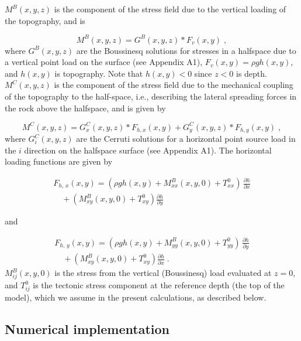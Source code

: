 \documentclass[draft,jgrga]{AGUTeX}
\begin{document}
\begin{article}
$M^B(x,y,z)$ is the component of the stress field due to the vertical
loading of the topography, and is

\begin{equation}
M^B(x, y, z) = G^B(x,y,z) * F_v(x, y) \; ,
\label{eqn:bous}
\end{equation}
where $G^B(x,y,z)$ are the Boussinesq solutions for stresses in a
halfspace due to a vertical point load on the surface (see Appendix A1), 
$F_v(x,y) = \rho g h(x,y)$, and $h(x,y)$ is topography. 
Note that $h(x,y)<0$ since $z<0$ is
depth. $M^C(x,y,z)$ is the component of the stress field due to the
mechanical coupling of the topography to the half-space, i.e.,
describing the lateral spreading forces in the rock above the halfspace,
and is given by

\begin{equation}
M^C(x, y, z) = G_x^C(x,y,z) * F_{h, x}(x, y) + G_y^C(x,y,z) * F_{h, y}(x, y) \; ,
\end{equation}
where $G_i^C(x,y,z)$ are the Cerruti solutions for a horizontal point
source load in the $i$ direction on the halfspace surface (see Appendix
A1). The horizontal loading functions are given by

\begin{equation}
\begin{split}
F_{h, \, x}(x,y) = ( \rho g h(x,y) + M_{xx}^B(x,y,0) + T^0_{xx} )\, \frac{\partial h}{ \partial x} \\
\quad + (M_{xy}^{B}(x,y,0) + T^0_{xy}) \frac{\partial h}{ \partial y}
\end{split}
\label{eqn:f_hor_xz}
\end{equation}

and

\begin{equation}
\begin{split}
F_{h, \, y}(x,y) = ( \rho g h(x,y) + M_{yy}^B(x,y,0) + T^0_{yy} )\, \frac{\partial h}{ \partial y} \\
\quad + (M_{xy}^{B}(x,y,0) + T^0_{xy}) \frac{\partial h}{ \partial x}\; . 
\end{split}
\label{eqn:f_hor_yz}
\end{equation}
$M_{ij}^B(x,y,0)$ is the stress from the vertical (Boussinesq) load
evaluated at $z=0$, and $T^0_{ij}$ is the tectonic stress component at the
reference depth (the top of the model), which we assume in the present 
calculations, as described below.

\subsection{Numerical implementation}\label{numerical-implementation}


\end{article}
\end{document}
